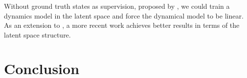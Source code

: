 \documentclass[11pt, reqno, letterpaper, twoside]{amsart}
\begin{document}
Without ground truth states as supervision, proposed by \cite{watter2015embed}, we could train a dynamics model in the latent space and force the dynamical model to be linear. As an extension to \cite{watter2015embed}, a more recent work \cite{levine2019prediction} achieves better results in terms of the latent space structure.

\section{Conclusion}

{
	
	
}
\end{document}
